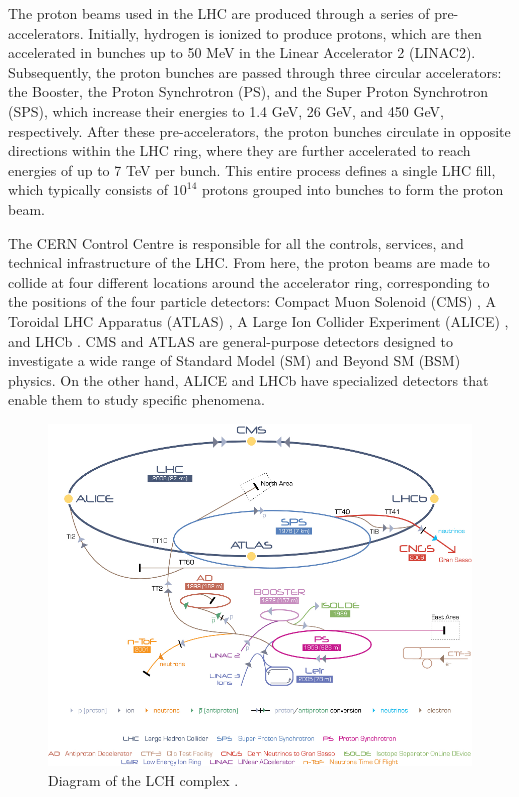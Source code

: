 The proton beams used in the LHC are produced through a series of pre-accelerators. Initially, hydrogen is ionized to produce protons, which are then accelerated in bunches up to 50 MeV in the Linear Accelerator 2 (LINAC2). Subsequently, the proton bunches are passed through three circular accelerators: the Booster, the Proton Synchrotron (PS), and the Super Proton Synchrotron (SPS), which increase their energies to 1.4 GeV, 26 GeV, and 450 GeV, respectively. After these pre-accelerators, the proton bunches circulate in opposite directions within the LHC ring, where they are further accelerated to reach energies of up to 7 TeV per bunch. This entire process defines a single LHC fill, which typically consists of $10^{14}$ protons grouped into bunches to form the proton beam.

The CERN Control Centre is responsible for all the controls, services, and technical infrastructure of the LHC. From here, the proton beams are made to collide at four different locations around the accelerator ring, corresponding to the positions of the four particle detectors: Compact Muon Solenoid (CMS) \cite{CMS_Exp_2008}, A Toroidal LHC Apparatus (ATLAS) \cite{Atlas_Exp_2008}, A Large Ion Collider Experiment (ALICE) \cite{ALICE_Exp_2008}, and LHCb \cite{LHCb_Exp_2008}. CMS and ATLAS are general-purpose detectors designed to investigate a wide range of Standard Model (SM) and Beyond SM (BSM) physics. On the other hand, ALICE and LHCb have specialized detectors that enable them to study specific phenomena.

\begin{center}
  \begin{figure}[h]
    \centering
    \includegraphics[scale=.41]{Chapter1/lhc_complex_fig.png}
    \caption[LHC Complex]{Diagram of the LCH complex \cite{lhc_complex}.}
    \label{lhc_com}
  \end{figure}
\end{center}


